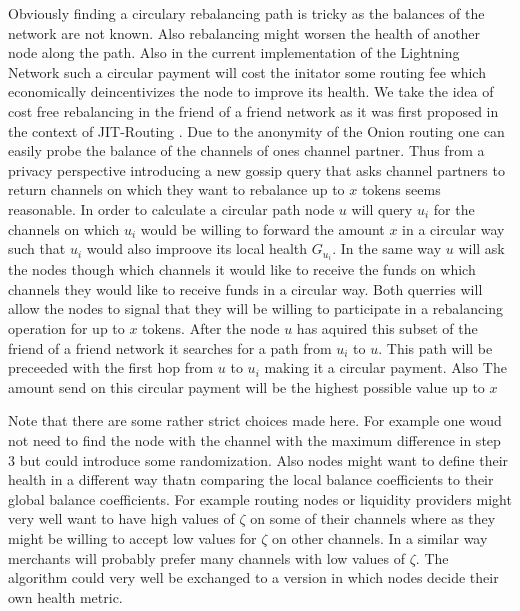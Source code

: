 \documentclass[a4paper]{paper}
\begin{document}
Obviously finding a circulary rebalancing path is tricky as the balances of the network are not known.
Also rebalancing might worsen the health of another node along the path.
Also in the current implementation of the Lightning Network such a circular payment will cost the initator some routing fee which economically deincentivizes the node to improve its health.
We take the idea of cost free rebalancing in the friend of a friend network as it was first proposed in the context of JIT-Routing \cite{pickhardt2019jit}.
Due to the anonymity of the Onion routing one can easily probe the balance of the channels of ones channel partner.
Thus from a privacy perspective introducing a new gossip query that asks channel partners to return channels on which they want to rebalance up to $x$ tokens seems reasonable.
In order to calculate a circular path node $u$ will query $u_i$ for the channels on which $u_i$ would be willing to forward the amount $x$ in a circular way such that $u_i$ would also improove its local health $G_{u_i}$.
In the same way $u$ will ask the nodes though which channels it would like to receive the funds on which channels they would like to receive funds in a circular way.
Both querries will allow the nodes to signal that they will be willing to participate in a rebalancing operation for up to $x$ tokens.
After the node $u$ has aquired this subset of the friend of a friend network it searches for a path from $u_i$ to $u$.
This path will be preceeded with the first hop from $u$ to $u_i$ making it a circular payment.
Also The amount send on this circular payment will be the highest possible value up to $x$

Note that there are some rather strict choices made here.
For example one woud not need to find the node with the channel with the maximum difference in step 3 but could introduce some randomization.
Also nodes might want to define their health in a different way thatn comparing the local balance coefficients to their global balance coefficients.
For example routing nodes or liquidity providers might very well want to have high values of $\zeta$ on some of their channels where as they might be willing to accept low values for $\zeta$ on other channels.
In a similar way merchants will probably prefer many channels with low values of $\zeta$.
The algorithm could very well be exchanged to a version in which nodes decide their own health metric.

\end{document}
